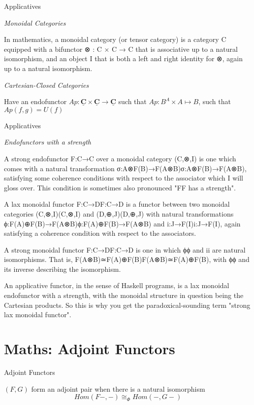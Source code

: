 \documentclass[10pt]{beamer}
\newcommand{\Cat}[1]{\ensuremath{\underline{\mathbf{#1}}}}
\theoremstyle{definition}
\theoremstyle{remark}
\numberwithin{equation}{section}
\begin{document}
\begin{frame}[fragile]{Applicatives}

  \emph{Monoidal Categories}

  In mathematics, a monoidal category (or tensor category) is a category C equipped with a bifunctor
⊗ : C × C → C
  that is associative up to a natural isomorphism, and an object I that is both a left and right identity for ⊗, again up to a natural isomorphism.

  \emph{Cartesian-Closed Categories}

  Have an endofunctor $Ap : \Cat{C}\times\Cat{C} \rightarrow \Cat{C}$ such that $Ap : B^A \times A \mapsto B$, such that $ Ap(f,g) = U(f)$

\end{frame}

\begin{frame}[fragile]{Applicatives}

  \emph{Endofunctors with a strength}

  A strong endofunctor F:C→C over a monoidal category (C,⊗,I) is one which comes with a natural transformation σ:A⊗F(B)→F(A⊗B)σ:A⊗F(B)→F(A⊗B), satisfying some coherence conditions with respect to the associator which I will gloss over. This condition is sometimes also pronounced "FF has a strength".

  A lax monoidal functor F:C→DF:C→D is a functor between two monoidal categories (C,⊗,I)(C,⊗,I) and (D,⊕,J)(D,⊕,J) with natural transformations ϕ:F(A)⊕F(B)→F(A⊗B)ϕ:F(A)⊕F(B)→F(A⊗B) and i:J→F(I)i:J→F(I), again satisfying a coherence condition with respect to the associators.

  A strong monoidal functor F:C→DF:C→D is one in which ϕϕ and ii are natural isomorphisms. That is, F(A⊗B)≃F(A)⊕F(B)F(A⊗B)≃F(A)⊕F(B), with ϕϕ and its inverse describing the isomorphism.

  An applicative functor, in the sense of Haskell programs, is a lax monoidal endofunctor with a strength, with the monoidal structure in question being the Cartesian products. So this is why you get the paradoxical-sounding term "strong lax monoidal functor".
\end{frame}

\section{Maths: Adjoint Functors}

\begin{frame}[fragile]{Adjoint Functors}

$(F,G)$ form an adjoint pair when there is a natural isomorphism
  \[
  Hom(F-,-) \cong_{\Phi} Hom(-,G-)
  \]
  
\end{frame}
\end{document}

